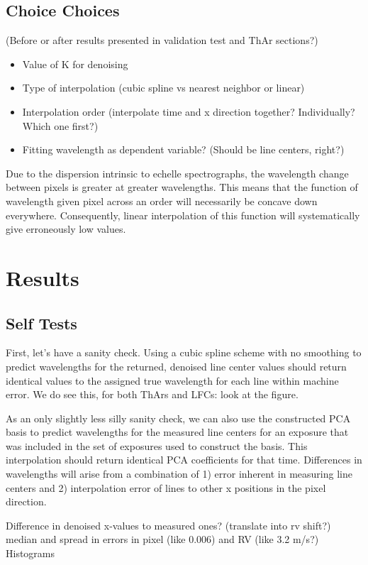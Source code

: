 \documentclass[12pt, letterpaper]{article}
\begin{document}
\subsection{Choice Choices} \label{sec:choices}
(Before or after results presented in validation test and ThAr sections?)
\begin{itemize}
	\item Value of K for denoising
	\item Type of interpolation (cubic spline vs nearest neighbor or linear)
	\item Interpolation order (interpolate time and x direction together?  Individually?  Which one first?)
	\item Fitting wavelength as dependent variable?  (Should be line centers, right?)
\end{itemize}

Due to the dispersion intrinsic to echelle spectrographs, the wavelength change between pixels is greater at greater wavelengths.  This means that the function of wavelength given pixel across an order will necessarily be concave down everywhere.  Consequently, linear interpolation of this function will systematically give erroneously low values.


\section{Results} \label{sec:results}
\subsection{Self Tests} \label{sec:test-self}
First, let's have a sanity check.  Using a cubic spline scheme with no smoothing to predict wavelengths for the returned, denoised line center values should return identical values to the assigned true wavelength for each line within machine error.
We do see this, for both ThArs and LFCs: look at the figure.

As an only slightly less silly sanity check, we can also use the constructed PCA basis to predict wavelengths for the measured line centers for an exposure that was included in the set of exposures used to construct the basis.  This interpolation should return identical PCA coefficients for that time.  Differences in wavelengths will arise from a combination of 1) error inherent in measuring line centers and 2) interpolation error of lines to other x positions in the pixel direction.

Difference in denoised x-values to measured ones? (translate into rv shift?)
median and spread in errors in pixel (like 0.006) and RV (like 3.2 m/s?)
Histograms
\end{document}
